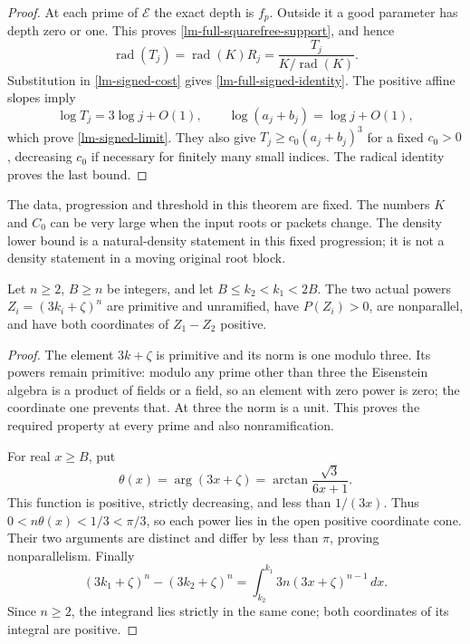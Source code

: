\begin{proof}
At each prime of \(\mathcal E\) the exact depth is \(f_p\).
Outside it a good parameter has depth zero or one. This proves
\eqref{lm-full-squarefree-support}, and hence
\[
 \operatorname{rad}(T_j)=\operatorname{rad}(K)R_j
      =\frac{T_j}{K/\operatorname{rad}(K)}.
\]
Substitution in \eqref{lm-signed-cost} gives
\eqref{lm-full-signed-identity}. The positive affine slopes imply
\[
 \log T_j=3\log j+O(1),\qquad
 \log(a_j+b_j)=\log j+O(1),
\]
which prove \eqref{lm-signed-limit}. They also give
\(T_j\ge c_0(a_j+b_j)^3\) for a fixed \(c_0>0\), decreasing
\(c_0\) if necessary for finitely many small indices. The radical
identity proves the last bound.
\end{proof}

The data, progression and threshold in this theorem are fixed. The
numbers \(K\) and \(C_0\) can be very large when the input roots or
packets change. The density lower bound is a natural-density statement
in this fixed progression; it is not a density statement in a moving
original root block.

\begin{proposition}
\label{lm-actual-source-roots}
Let \(n\ge2\), \(B\ge n\) be integers, and let
\(B\le k_2<k_1<2B\). The two actual powers
\(Z_i=(3k_i+\zeta)^n\) are primitive and unramified, have
\(P(Z_i)>0\), are nonparallel, and have both coordinates of
\(Z_1-Z_2\) positive.
\end{proposition}
\begin{proof}
The element \(3k+\zeta\) is primitive and its norm is one modulo
three. Its powers remain primitive: modulo any prime other than
three the Eisenstein algebra is a product of fields or a field, so
an element with zero power is zero; the coordinate one prevents that.
At three the norm is a unit. This proves the required property at
every prime and also nonramification.

For real \(x\ge B\), put
\[
 \theta(x)=\arg(3x+\zeta)
       =\arctan\frac{\sqrt3}{6x+1}.
\]
This function is positive, strictly decreasing, and less than
\(1/(3x)\). Thus \(0<n\theta(x)<1/3<\pi/3\), so each power
lies in the open positive coordinate cone. Their two arguments
are distinct and differ by less than \(\pi\), proving
nonparallelism. Finally
\[
 (3k_1+\zeta)^n-(3k_2+\zeta)^n
    =\int_{k_2}^{k_1}3n(3x+\zeta)^{n-1}\,dx.
\]
Since \(n\ge2\), the integrand lies strictly in the same cone;
both coordinates of its integral are positive.
\end{proof}

